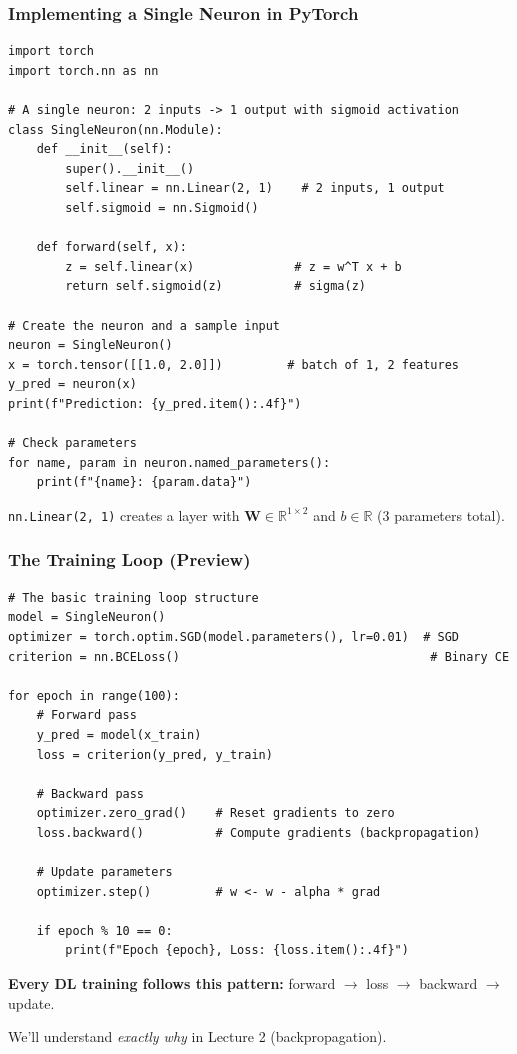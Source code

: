 \documentclass[notes,11pt, aspectratio=169]{beamer}
\newcommand{\vW}{\mathbf{W}}
\newcommand{\R}{\mathbb{R}}
\begin{document}
\begin{frame}[fragile]
\frametitle{Implementing a Single Neuron in PyTorch}

\begin{lstlisting}
import torch
import torch.nn as nn

# A single neuron: 2 inputs -> 1 output with sigmoid activation
class SingleNeuron(nn.Module):
    def __init__(self):
        super().__init__()
        self.linear = nn.Linear(2, 1)    # 2 inputs, 1 output
        self.sigmoid = nn.Sigmoid()

    def forward(self, x):
        z = self.linear(x)              # z = w^T x + b
        return self.sigmoid(z)          # sigma(z)

# Create the neuron and a sample input
neuron = SingleNeuron()
x = torch.tensor([[1.0, 2.0]])         # batch of 1, 2 features
y_pred = neuron(x)
print(f"Prediction: {y_pred.item():.4f}")

# Check parameters
for name, param in neuron.named_parameters():
    print(f"{name}: {param.data}")
\end{lstlisting}

\vspace{2pt}
{\small \texttt{nn.Linear(2, 1)} creates a layer with $\vW \in \R^{1\times 2}$ and $b \in \R$ (3 parameters total).}
\end{frame}

\begin{frame}[fragile]
\frametitle{The Training Loop (Preview)}

\begin{lstlisting}
# The basic training loop structure
model = SingleNeuron()
optimizer = torch.optim.SGD(model.parameters(), lr=0.01)  # SGD
criterion = nn.BCELoss()                                   # Binary CE

for epoch in range(100):
    # Forward pass
    y_pred = model(x_train)
    loss = criterion(y_pred, y_train)

    # Backward pass
    optimizer.zero_grad()    # Reset gradients to zero
    loss.backward()          # Compute gradients (backpropagation)

    # Update parameters
    optimizer.step()         # w <- w - alpha * grad

    if epoch % 10 == 0:
        print(f"Epoch {epoch}, Loss: {loss.item():.4f}")
\end{lstlisting}

\vspace{4pt}
\begin{center}
\textbf{Every DL training follows this pattern:} forward $\to$ loss $\to$ backward $\to$ update.

We'll understand \emph{exactly why} in Lecture 2 (backpropagation).
\end{center}
\end{frame}
\end{document}
